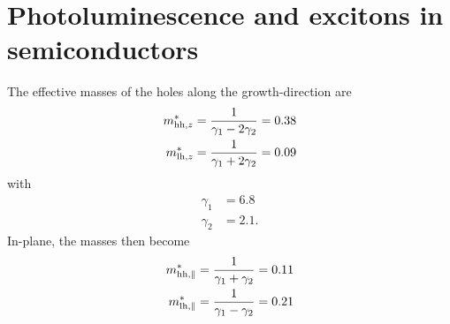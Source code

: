 \chapter{Photoluminescence and excitons in semiconductors}\label{ch:exp:theory}
The effective masses of the holes along the growth-direction are
\begin{align}
    m_{\mathrm{hh},z}^{\ast} &= \frac{1}{\gamma_1 - 2\gamma_2} = 0.38 \\
    m_{\mathrm{lh},z}^{\ast} &= \frac{1}{\gamma_1 + 2\gamma_2} = 0.09
\end{align}
with
\begin{align}
    \gamma_1 &= 6.8 \\
    \gamma_2 &= 2.1.
\end{align}
In-plane, the masses then become
\begin{align}
    m_{\mathrm{hh},\parallel}^{\ast} &= \frac{1}{\gamma_1 + \gamma_2} = 0.11 \\
    m_{\mathrm{lh},\parallel}^{\ast} &= \frac{1}{\gamma_1 - \gamma_2} = 0.21
\end{align}


